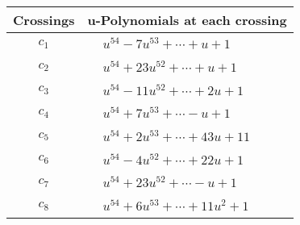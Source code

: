 \documentclass[1p]{elsarticle_modified}
\theoremstyle{definition}
\begin{document}
\begin{tabular}{m{50pt}|m{274pt}}
Crossings & \hspace{64pt}u-Polynomials at each crossing \\
\hline $$\begin{aligned}c_{1}\end{aligned}$$&$\begin{aligned}
&u^{54}-7 u^{53}+\cdots+u+1
\end{aligned}$\\
\hline $$\begin{aligned}c_{2}\end{aligned}$$&$\begin{aligned}
&u^{54}+23 u^{52}+\cdots+u+1
\end{aligned}$\\
\hline $$\begin{aligned}c_{3}\end{aligned}$$&$\begin{aligned}
&u^{54}-11 u^{52}+\cdots+2 u+1
\end{aligned}$\\
\hline $$\begin{aligned}c_{4}\end{aligned}$$&$\begin{aligned}
&u^{54}+7 u^{53}+\cdots- u+1
\end{aligned}$\\
\hline $$\begin{aligned}c_{5}\end{aligned}$$&$\begin{aligned}
&u^{54}+2 u^{53}+\cdots+43 u+11
\end{aligned}$\\
\hline $$\begin{aligned}c_{6}\end{aligned}$$&$\begin{aligned}
&u^{54}-4 u^{52}+\cdots+22 u+1
\end{aligned}$\\
\hline $$\begin{aligned}c_{7}\end{aligned}$$&$\begin{aligned}
&u^{54}+23 u^{52}+\cdots- u+1
\end{aligned}$\\
\hline $$\begin{aligned}c_{8}\end{aligned}$$&$\begin{aligned}
&u^{54}+6 u^{53}+\cdots+11 u^2+1
\end{aligned}$\\

\end{tabular}
\end{document}
